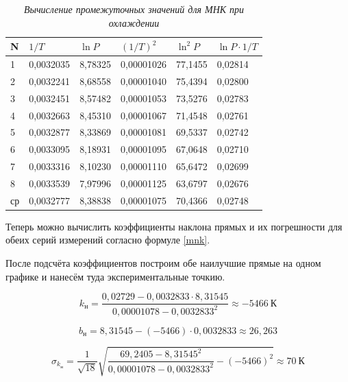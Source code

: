 \documentclass[a4paper,12pt]{article}
\begin{document}
\begin{table}[!h]
    \centering
    \begin{tabular}{|l|l|l|l|l|l|}
    \hline
        N & $1/T$ & $\ln{P} $& $(1/T)^2$ & $\ln^2{P}$ & $\ln{P} \cdot 1/T$ \\ \hline
        1 & 0,0032035 & 8,78325 & 0,00001026 & 77,1455 & 0,02814 \\ \hline
        2 & 0,0032241 & 8,68558 & 0,00001040 & 75,4394 & 0,02800 \\ \hline
        3 & 0,0032451 & 8,57482 & 0,00001053 & 73,5276 & 0,02783 \\ \hline
        4 & 0,0032663 & 8,45310 & 0,00001067 & 71,4548 & 0,02761 \\ \hline
        5 & 0,0032877 & 8,33869 & 0,00001081 & 69,5337 & 0,02742 \\ \hline
        6 & 0,0033095 & 8,18931 & 0,00001095 & 67,0648 & 0,02710 \\ \hline
        7 & 0,0033316 & 8,10230 & 0,00001110 & 65,6472 & 0,02699 \\ \hline
        8 & 0,0033539 & 7,97996 & 0,00001125 & 63,6797 & 0,02676 \\ \hline
        ср & 0,0032777 & 8,38838 & 0,00001075 & 70,4366 & 0,02748 \\ \hline
    \end{tabular}\caption{\textit{Вычисление промежуточных значений для МНК при охлаждении}}\label{mnk-2}
\end{table}

Теперь можно вычислить коэффициенты наклона прямых и их погрешности для обеих серий измерений согласно формуле \eqref{mnk}.

После подсчёта коэффициентов построим обе наилучшие прямые на одном графике и нанесём туда экспериментальные точкию.

\begin{equation}
    k_\text{н} = \frac{0,02729 - 0,0032833 \cdot 8,31545}{0,00001078 - {0,0032833}^2} \approx -5466 \ \text{К}
\end{equation}

\begin{equation}
    b_\text{н} = 8,31545 - (-5466) \cdot 0,0032833 \approx 26,263
\end{equation}

\begin{equation}
    \sigma_{k_\text{н}} = \frac{1}{\sqrt{18}} \sqrt{
    \frac{69,2405 - {8,31545}^2}{0,00001078 - {0,0032833}^2} - (-5466)^2
    } \approx 70 \ \text{К}
\end{equation}
\end{document}
